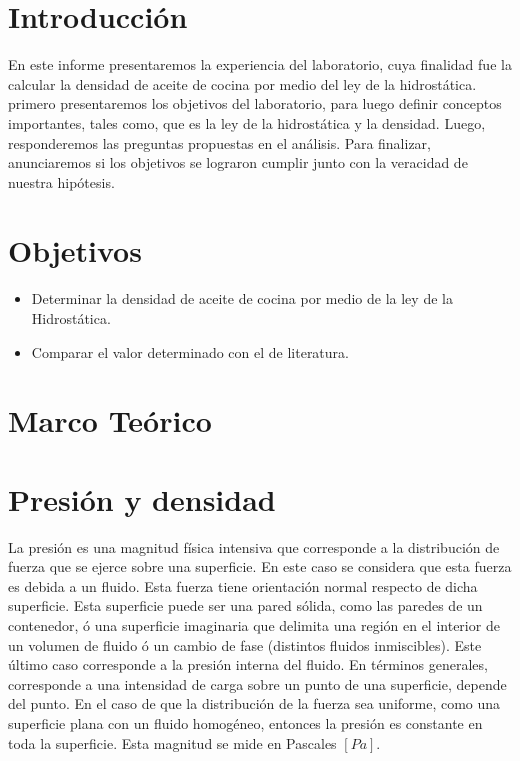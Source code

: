 \documentclass[a4paper, 12p]{article}
\begin{document}
\section{Introducción}
En este informe presentaremos la experiencia del laboratorio, cuya finalidad fue la calcular la densidad de aceite de cocina por medio del ley de la hidrostática. primero presentaremos los objetivos del laboratorio, para luego definir conceptos importantes, tales como, que es la ley de la hidrostática y la densidad. Luego, responderemos las preguntas propuestas en el análisis. Para finalizar, anunciaremos si los objetivos se lograron cumplir junto con la veracidad de nuestra hipótesis.

\section{Objetivos}
\begin{itemize}
      \item Determinar la densidad de aceite de cocina por medio de la ley de la Hidrostática.
      
      \item Comparar el valor determinado con el de literatura.
\end{itemize}



\section{Marco Teórico} 
\section*{Presión y densidad}
La presión es una magnitud física intensiva que corresponde a la distribución de fuerza que se ejerce sobre una superficie. En este caso se considera que esta fuerza es debida a un fluido. 
Esta fuerza tiene orientación normal respecto de dicha superficie. Esta superficie puede ser una pared sólida, como las paredes de un contenedor, ó una superficie imaginaria que delimita una 
región en el interior de un volumen de fluido ó un cambio de fase (distintos fluidos inmiscibles). Este último caso corresponde a la presión interna del fluido. En términos generales, 
corresponde a una intensidad de carga sobre un punto de una superficie, depende del punto. En el caso de que la distribución de la fuerza sea uniforme, como una superficie plana con un fluido homogéneo, 
entonces la presión es constante en toda la superficie. Esta magnitud se mide en Pascales $[Pa]$.
\end{document}
